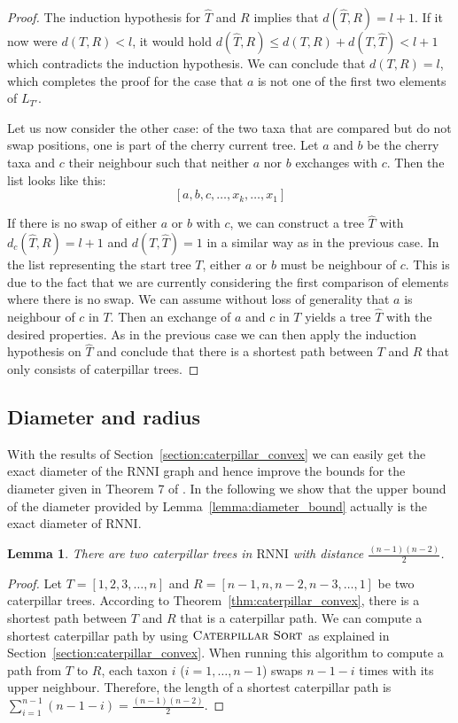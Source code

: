 \documentclass{amsart}
\newcommand{\rnni}{\mathrm{RNNI}}
\newcommand{\csort}{\textsc{Caterpillar Sort}}
\newtheorem{lemma}[definition]{Lemma}
\begin{document}
\begin{proof}
The induction hypothesis for $\hat T$ and $R$ implies that $d(\hat T,R) = l+1$.
If it now were $d(T,R) < l$, it would hold $d(\hat T,R) \leq d(T,R) + d(T,\hat T) < l + 1$ which contradicts the induction hypothesis.
We can conclude that $d(T,R) = l$, which completes the proof for the case that $a$ is not one of the first two elements of $L_{T'}$.

Let us now consider the other case: of the two taxa that are compared but do not swap positions, one is part of the cherry current tree.
Let $a$ and $b$ be the cherry taxa and $c$ their neighbour such that neither $a$ nor $b$ exchanges with $c$.
Then the list looks like this:
\[[a, b, c, \ldots, x_k, \ldots, x_1]\]

If there is no swap of either $a$ or $b$ with $c$, we can construct a tree $\hat T$ with $d_c(\hat T, R) = l+1$ and $d(T,\hat T) = 1$ in a similar way as in the previous case.
In the list representing the start tree $T$, either $a$ or $b$ must be neighbour of $c$.
This is due to the fact that we are currently considering the first comparison of elements where there is no swap.
We can assume without loss of generality that $a$ is neighbour of $c$ in $T$.
Then an exchange of $a$ and $c$ in $T$ yields a tree $\hat T$ with the desired properties.
As in the previous case we can then apply the induction hypothesis on $\hat T$ and conclude that there is a shortest path between $T$ and $R$ that only consists of caterpillar trees.
\end{proof}


\subsection{Diameter and radius}
\label{section:diameter}

With the results of Section~\ref{section:caterpillar_convex} we can easily get the exact diameter of the $\rnni$ graph and hence improve the bounds for the diameter given in Theorem 7 of \autocite{Gavryushkin2018-ol}.
In the following we show that the upper bound of the diameter provided by Lemma~\ref{lemma:diameter_bound} actually is the exact diameter of $\rnni$.

\begin{lemma}
There are two caterpillar trees in $\rnni$ with distance $\frac{(n-1)(n-2)}{2}$.
\label{lemma:caterpillar_diameter}
\end{lemma}

\begin{proof}
Let $T = [1,2,3,\ldots,n]$ and $R = [n-1,n,n-2,n-3, \ldots, 1]$ be two caterpillar trees.
According to Theorem~\ref{thm:caterpillar_convex}, there is a shortest path between $T$ and $R$ that is a caterpillar path.
We can compute a shortest caterpillar path by using $\csort$ as explained in Section~\ref{section:caterpillar_convex}.
When running this algorithm to compute a path from $T$ to $R$, each taxon $i$ ($i = 1, \ldots, n-1$) swaps $n-1-i$ times with its upper neighbour.
Therefore, the length of a shortest caterpillar path is $\sum\limits_{i=1}^{n-1}(n-1-i)  = \frac{(n-1)(n-2)}{2}$.
\end{proof}
\end{document}
